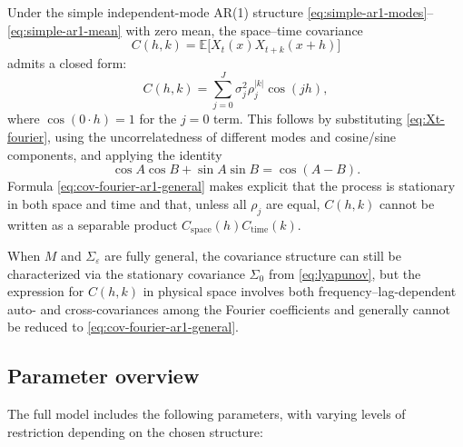 \documentclass[answers,12pt,addpoints]{exam}
\begin{document}
Under the simple independent-mode AR(1) structure \eqref{eq:simple-ar1-modes}--\eqref{eq:simple-ar1-mean} with zero mean, the space--time covariance
\[
  C(h,k) = \mathbb{E}\bigl[ X_t(x) X_{t+k}(x+h) \bigr]
\]
admits a closed form:
\begin{equation}
  C(h,k)
  =
  \sum_{j=0}^{J}
  \sigma_j^2 \rho_j^{|k|} \cos(jh),
  \label{eq:cov-fourier-ar1-general}
\end{equation}
where $\cos(0\cdot h)=1$ for the $j=0$ term. This follows by substituting \eqref{eq:Xt-fourier}, using the uncorrelatedness of different modes and cosine/sine components, and applying the identity
\[
  \cos A\cos B + \sin A\sin B = \cos(A-B).
\]
Formula \eqref{eq:cov-fourier-ar1-general} makes explicit that the process is stationary in both space and time and that, unless all $\rho_j$ are equal, $C(h,k)$ cannot be written as a separable product $C_{\text{space}}(h) C_{\text{time}}(k)$.

When $M$ and $\Sigma_\varepsilon$ are fully general, the covariance structure can still be characterized via the stationary covariance $\Sigma_0$ from \eqref{eq:lyapunov}, but the expression for $C(h,k)$ in physical space involves both frequency--lag-dependent auto- and cross-covariances among the Fourier coefficients and generally cannot be reduced to \eqref{eq:cov-fourier-ar1-general}.

\subsection{Parameter overview}

The full model includes the following parameters, with varying levels of restriction depending on the chosen structure:
\end{document}
